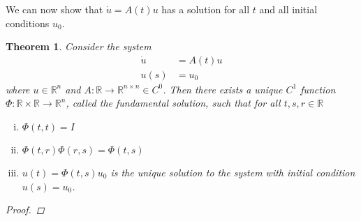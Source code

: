 \documentclass{article}
\newtheorem{theorem}{Theorem}[section]
\def\R{{\mathbb R}}
\begin{document}
We can now show that $\dot{u} = A(t) u$ has a solution for all $t$ and all initial conditions $u_0$.

\begin{theorem}
Consider the system
\begin{align*}
\dot{u} &= A(t) u \\
u(s) &= u_0
\end{align*}
where $u \in \R^n$ and $A:\R \rightarrow \R^{n \times n} \in C^0$. Then there exists a unique $C^1$ function $\Phi: \R \times \R \rightarrow \R^n$, called the \emph{fundamental solution}, such that for all $t, s, r \in \R$
\begin{enumerate}[(i)]
\item $\Phi(t, t) = I$ \\
\item $\Phi(t, r)\Phi(r, s) = \Phi(t,s)$
\item $u(t) = \Phi(t, s)u_0$ is the unique solution to the system with initial condition $u(s) = u_0$.
\end{enumerate}
\begin{proof}
\end{proof}
\end{theorem}
\end{document}
